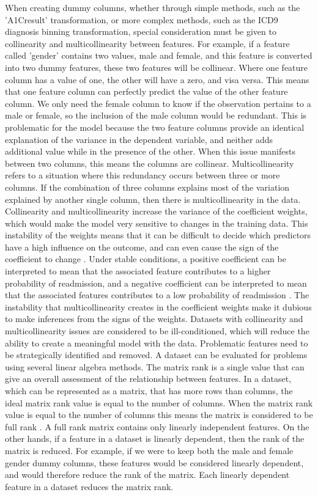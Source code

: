 \documentclass[sigconf]{acmart}
\begin{document}
When creating dummy columns, whether through simple methods, such as the 'A1Cresult' transformation, or more complex methods, such as the ICD9 diagnosis binning transformation, special consideration must be given to collinearity and multicollinearity between features. For example, if a feature called 'gender' contains two values, male and female, and this feature is converted into two dummy features, these two features will be collinear. Where one feature column has a value of one, the other will have a zero, and visa versa. This means that one feature column can perfectly predict the value of the other feature column. We only need the female column to know if the observation pertains to a male or female, so the inclusion of the male column would be redundant. This is problematic for the model because the two feature columns provide an identical explanation of the variance in the dependent variable, and neither adds additional value while in the presence of the other. When this issue manifests between two columns, this means the columns are collinear. Multicollinearity refers to a situation where this redundancy occurs between three or more columns. If the combination of three columns explains most of the variation explained by another single column, then there is multicollinearity in the data.
Collinearity and multicollinearity increase the variance of the coefficient weights, which would make the model very sensitive to changes in the training data. This instability of the weights means that it can be difficult to decide which predictors have a high influence on the outcome, and can even cause the sign of the coefficient to change \cite{cite16}. Under stable conditions, a positive coefficient can be interpreted to mean that the associated feature contributes to a higher probability of readmission, and a negative coefficient can be interpreted to mean that the associated features contributes to a low probability of readmission \cite{cite03}. The instability that multicollinearity creates in the coefficient weights make it dubious to make inferences from the signs of the weights.
Datasets with collinearity and multicollinearity issues are considered to be ill-conditioned, which will reduce the ability to create a meaningful model with the data. Problematic features need to be strategically identified and removed. A dataset can be evaluated for problems using several linear algebra methods. The matrix rank is a single value that can give an overall assessment of the relationship between features. In a dataset, which can be represented as a matrix, that has more rows than columns, the ideal matrix rank value is equal to the number of columns. When the matrix rank value is equal to the number of columns this means the matrix is considered to be full rank \cite{cite14}. A full rank matrix contains only linearly independent features. On the other hands, if a feature in a dataset is linearly dependent, then the rank of the matrix is reduced. For example, if we were to keep both the male and female gender dummy columns, these features would be considered linearly dependent, and would therefore reduce the rank of the matrix. Each linearly dependent feature in a dataset reduces the matrix rank.
\end{document}

